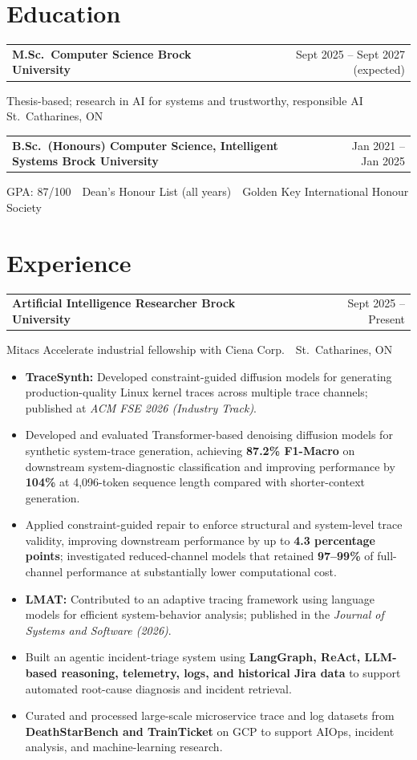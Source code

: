 \documentclass[10pt,letterpaper]{extarticle}
\makeatletter
\newcommand{\entry}[2]{%
  \vspace{2.5pt}%
  \noindent
  \begin{tabular*}{\textwidth}{@{}l@{\extracolsep{\fill}}r@{}}
    \textbf{#1} & {\color{muted}\small #2} \\
  \end{tabular*}
  \par\vspace{-1pt}%
}
\newcommand{\meta}[1]{%
  {\color{muted}\small #1}\par\vspace{1pt}%
}
\makeatother
\begin{document}
\section{Education}

\entry{M.Sc.\ Computer Science \textnormal{\textbar} Brock University}
{Sept 2025 -- Sept 2027 (expected)}
\meta{Thesis-based; research in AI for systems and trustworthy, responsible AI \,\textbar\, St.\ Catharines, ON}

\entry{B.Sc.\ (Honours) Computer Science, Intelligent Systems \textnormal{\textbar} Brock University}
{Jan 2021 -- Jan 2025}
\meta{GPA: 87/100 \,\textbar\, Dean's Honour List (all years) \,\textbar\, Golden Key International Honour Society}

\section{Experience}

\entry{Artificial Intelligence Researcher \textnormal{\textbar} Brock University}
{Sept 2025 -- Present}
\meta{Mitacs Accelerate industrial fellowship with Ciena Corp. \,\textbar\, St.\ Catharines, ON}

\begin{itemize}
\item \textbf{TraceSynth:} Developed constraint-guided diffusion models for generating production-quality Linux kernel traces across multiple trace channels; published at \textit{ACM FSE 2026 (Industry Track)}.

\item Developed and evaluated Transformer-based denoising diffusion models for synthetic system-trace generation, achieving \textbf{87.2\% F1-Macro} on downstream system-diagnostic classification and improving performance by \textbf{104\%} at 4,096-token sequence length compared with shorter-context generation.

\item Applied constraint-guided repair to enforce structural and system-level trace validity, improving downstream performance by up to \textbf{4.3 percentage points}; investigated reduced-channel models that retained \textbf{97--99\%} of full-channel performance at substantially lower computational cost.

\item \textbf{LMAT:} Contributed to an adaptive tracing framework using language models for efficient system-behavior analysis; published in the \textit{Journal of Systems and Software (2026)}.

\item Built an agentic incident-triage system using \textbf{LangGraph, ReAct, LLM-based reasoning, telemetry, logs, and historical Jira data} to support automated root-cause diagnosis and incident retrieval.

\item Curated and processed large-scale microservice trace and log datasets from \textbf{DeathStarBench and TrainTicket} on GCP to support AIOps, incident analysis, and machine-learning research.
\end{itemize}
\end{document}
